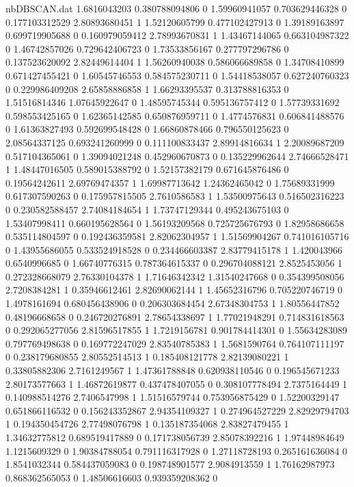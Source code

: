 \begin{filecontents}{nbDBSCAN.dat}
1.6816043203 0.380788094806 0
1.59960941057 0.703629446328 0
0.177103312529 2.80893680451 1
1.52120605799 0.477102427913 0
1.39189163897 0.699719905688 0
0.160979059412 2.78993670831 1
1.43467144065 0.663104987322 0
1.46742857026 0.729642406723 0
1.73533856167 0.277797296786 0
0.137523620092 2.82449614404 1
1.56260940038 0.586066689858 0
1.34708410899 0.671427455421 0
1.60545746553 0.584575230711 0
1.54418538057 0.627240760323 0
0.229986409208 2.65858886858 1
1.66293395537 0.313788816353 0
1.51516814346 1.07645922647 0
1.48595745344 0.595136757412 0
1.57739331692 0.598553425165 0
1.62365142585 0.650876959711 0
1.4774576831 0.606841488576 0
1.61363827493 0.592699548428 0
1.66860878466 0.796550125623 0
2.08564337125 0.693241260999 0
0.111100833437 2.89914816634 1
2.20089687209 0.517104365061 0
1.39094021248 0.452960670873 0
0.135229962644 2.74666528471 1
1.48447016505 0.589015388792 0
1.52157382179 0.671645876486 0
0.19564242611 2.69769474357 1
1.69987713642 1.24362465042 0
1.75689331999 0.617307590263 0
0.175957815505 2.7610586583 1
1.53500975643 0.516502316223 0
0.230582588457 2.74084184654 1
1.73747129344 0.495243675103 0
1.53407998411 0.660195628564 0
1.56193209568 0.725725676793 0
1.82958686658 0.535114804597 0
0.192436359581 2.82062304957 1
1.51569904267 0.741016105716 0
1.43955686055 0.533524918528 0
0.234466603387 2.83779415178 1
1.420043966 0.6540996685 0
1.66740776315 0.787364615337 0
0.296704088121 2.8525453056 1
0.272328668079 2.76330104378 1
1.71646342342 1.31540247668 0
0.354399508056 2.7208384281 1
0.35946612461 2.82690062144 1
1.45652316796 0.705220746719 0
1.4978161694 0.680456438906 0
0.206303684454 2.67348304753 1
1.80556447852 0.48196668658 0
0.246720276891 2.78654338697 1
1.77021948291 0.714831618563 0
0.292065277056 2.81596517855 1
1.7219156781 0.901784414301 0
1.55634283089 0.797769498638 0
0.169772247029 2.83540785383 1
1.5681590764 0.764107111197 0
0.238179680855 2.80552514513 1
0.185408121778 2.82139080221 1
0.33805882306 2.7161249567 1
1.47361788848 0.620938110546 0
0.196545671233 2.80173577663 1
1.46872619877 0.437478407055 0
0.308107778494 2.7375164449 1
0.140988514276 2.7406547998 1
1.51516579744 0.753956875429 0
1.52200329147 0.651866116532 0
0.156243352867 2.94354109327 1
0.274964527229 2.82929794703 1
0.194350454726 2.77498076798 1
0.135187354068 2.83827479455 1
1.34632775812 0.689519417889 0
0.171738056739 2.85078392216 1
1.97448984649 1.1215609329 0
1.90384788054 0.791116317928 0
1.27118728193 0.265161636084 0
1.8541032344 0.584437059083 0
0.198748901577 2.9084913559 1
1.76162987973 0.868362565053 0
1.48506616603 0.939359208362 0

\end{filecontents}
